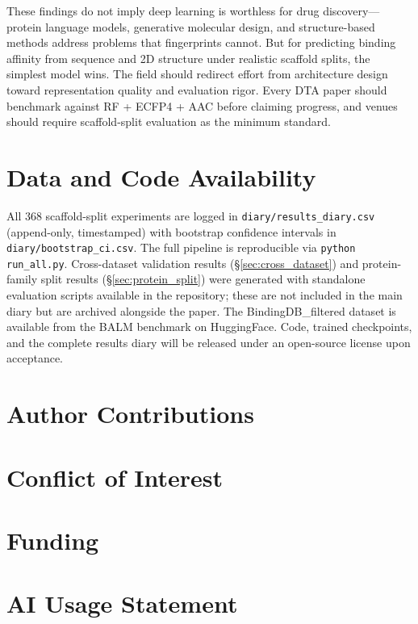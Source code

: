 \documentclass[pmlr,twocolumn]{jmlr}
\begin{document}
These findings do not imply deep learning is worthless for drug discovery---protein language models, generative molecular design, and structure-based methods address problems that fingerprints cannot. But for predicting binding affinity from sequence and 2D structure under realistic scaffold splits, the simplest model wins. The field should redirect effort from architecture design toward representation quality and evaluation rigor. Every DTA paper should benchmark against RF + ECFP4 + AAC before claiming progress, and venues should require scaffold-split evaluation as the minimum standard.

\section*{Data and Code Availability}
All 368 scaffold-split experiments are logged in \texttt{diary/results\_diary.csv} (append-only, timestamped) with bootstrap confidence intervals in \texttt{diary/bootstrap\_ci.csv}. The full pipeline is reproducible via \texttt{python run\_all.py}. Cross-dataset validation results (\S\ref{sec:cross_dataset}) and protein-family split results (\S\ref{sec:protein_split}) were generated with standalone evaluation scripts available in the repository; these are not included in the main diary but are archived alongside the paper. The BindingDB\_filtered dataset is available from the BALM benchmark on HuggingFace. Code, trained checkpoints, and the complete results diary will be released under an open-source license upon acceptance.

\section*{Author Contributions}

\section*{Conflict of Interest}

\section*{Funding}

\section*{AI Usage Statement}


\end{document}
